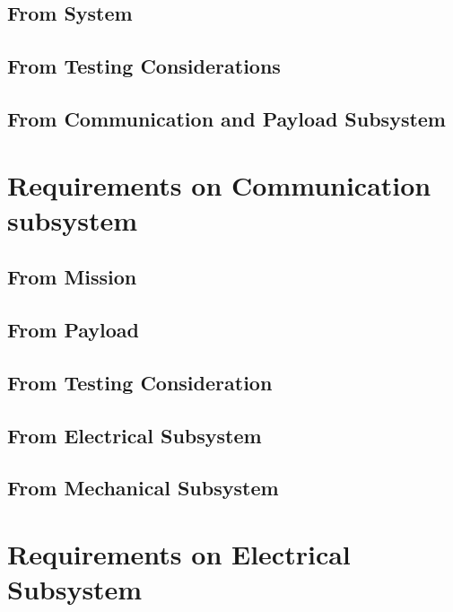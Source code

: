 \documentclass[../../main.tex]{subfiles}
\begin{document}
\subsection{From System}
\subsection{From Testing Considerations}
\subsection{From Communication and Payload \mbox{Subsystem} }


\newpage
\section{Requirements on Communication subsystem}
\subsection{From Mission}
\subsection{From Payload}
\subsection{From Testing Consideration}
\subsection{From Electrical Subsystem}
\subsection{From Mechanical Subsystem}


\newpage
\section{Requirements on Electrical Subsystem}
\end{document}
